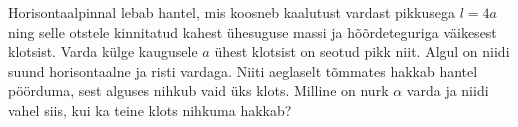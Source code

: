 \documentclass[a4paper,11pt,twocolumn]{article}
\begin{document}
\begin{question}[Lõppv 2015, G9][sta5][6cm]
	Horisontaalpinnal lebab hantel, mis koosneb kaalutust vardast pikkusega $ l = 4a $ ning selle otstele kinnitatud kahest ühesuguse massi ja hõõrdeteguriga väikesest klotsist. Varda külge kaugusele $ a $ ühest klotsist on seotud pikk niit. Algul on niidi suund horisontaalne ja risti vardaga. Niiti aeglaselt tõmmates hakkab hantel pöörduma, sest alguses nihkub vaid üks klots. Milline on nurk $ \alpha $ varda ja niidi vahel siis, kui ka teine klots nihkuma hakkab? 
\end{question}
\end{document}
